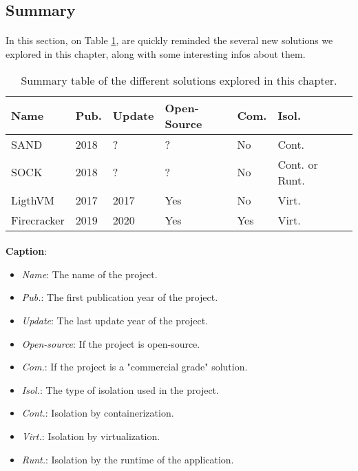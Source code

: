 \subsection{Summary}
\paragraph{}In this section, on Table \ref{tab:summary}, are quickly reminded the several new solutions we explored in this chapter, along with some interesting infos about them.
\begin{table}[!h]

  \begin{center}
    \begin{tabular}{|p{}|p{}|p{}|p{}|p{}|p{}|p{}|}
       \hline
       \textbf{Name} & \textbf{Pub.} & \textbf{Update} & \textbf{Open-Source} & \textbf{Com.} & \textbf{Isol.} \\
       \hline
       SAND & 2018 & ? & ? & No & Cont. \\
       \hline
       SOCK & 2018 & ? & ? & No & Cont. or Runt. \\
       \hline
       LigthVM & 2017 & 2017 & Yes & No & Virt. \\
       \hline
       Firecracker & 2019 & 2020 & Yes & Yes & Virt.\\
       \hline
    \end{tabular}
  \end{center}
  \caption{Summary table of the different solutions explored in this chapter.}
  \label{tab:summary}
\end{table}
\paragraph{}\textbf{Caption}: 
\begin{itemize}
\renewcommand\labelitemi{--}
  \item \textit{Name}: The name of the project.
  \item \textit{Pub.}: The first publication year of the project.
  \item \textit{Update}: The last update year of the project.
  \item \textit{Open-source}: If the project is open-source.
  \item \textit{Com.}: If the project is a "commercial grade" solution.
  \item \textit{Isol.}: The type of isolation used in the project.
  \item \textit{Cont.}: Isolation by containerization.
  \item \textit{Virt.}: Isolation by virtualization.
  \item \textit{Runt.}: Isolation by the runtime of the application.
\end{itemize}

